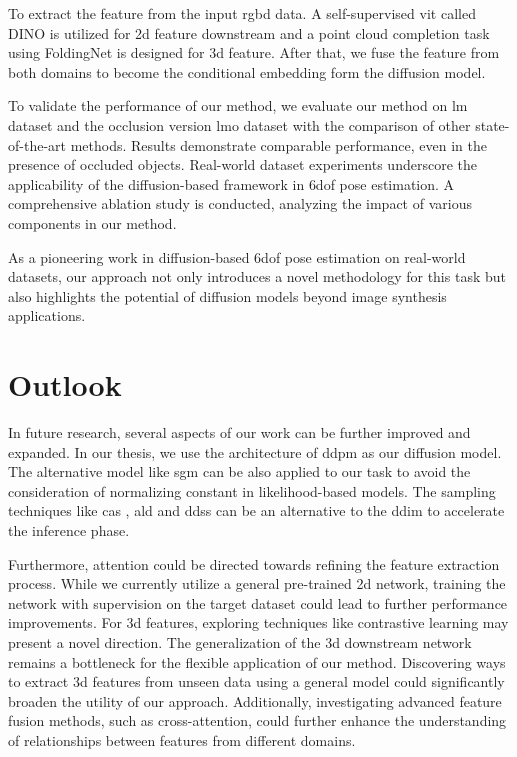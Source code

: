 \documentclass[12pt,DIV14,BCOR12mm,a4paper,footinclude=false,headinclude,parskip=half-,twoside,openright,cleardoublepage=empty,toc=index,bibliography=totoc,listof=totoc]{scrreprt}
\numberwithin{equation}{chapter}
\begin{document}
To extract the feature from the input \gls{rgbd} data. A self-supervised \gls{vit} called DINO \cite{caron2021emerging} is utilized for \gls{2d} feature downstream and a point cloud completion task using FoldingNet \cite{yang2018foldingnet} is designed for \gls{3d} feature. After that, we fuse the feature from both domains to become the conditional embedding form the diffusion model.

To validate the performance of our method, we evaluate our method on \gls{lm} \cite{hinterstoisser2012model} dataset and the occlusion version \gls{lmo} \cite{dataV4MUMX2020} dataset with the comparison of other state-of-the-art methods. Results demonstrate comparable performance, even in the presence of occluded objects. Real-world dataset experiments underscore the applicability of the diffusion-based framework in \gls{6dof} pose estimation. A comprehensive ablation study is conducted, analyzing the impact of various components in our method.

As a pioneering work in diffusion-based \gls{6dof} pose estimation on real-world datasets, our approach not only introduces a novel methodology for this task but also highlights the potential of diffusion models beyond image synthesis applications.

\section{Outlook}
In future research, several aspects of our work can be further improved and expanded. In our thesis, we use the architecture of \gls{ddpm} as our diffusion model. The alternative model like \gls{sgm} \cite{song2020generative,song2020improved} can be also applied to our task to avoid the consideration of normalizing constant in likelihood-based models. The sampling techniques like \gls{cas} \cite{jolicoeurmartineau2020adversarial}, \gls{ald} \cite{dockhorn2022scorebased} and \gls{ddss} \cite{watson2022learning} can be an alternative to the \gls{ddim} to accelerate the inference phase.

Furthermore, attention could be directed towards refining the feature extraction process. While we currently utilize a general pre-trained \gls{2d} network, training the network with supervision on the target dataset could lead to further performance improvements. For \gls{3d} features, exploring techniques like contrastive learning may present a novel direction. The generalization of the \gls{3d} downstream network remains a bottleneck for the flexible application of our method. Discovering ways to extract \gls{3d} features from unseen data using a general model could significantly broaden the utility of our approach. Additionally, investigating advanced feature fusion methods, such as cross-attention, could further enhance the understanding of relationships between features from different domains.
\end{document}
